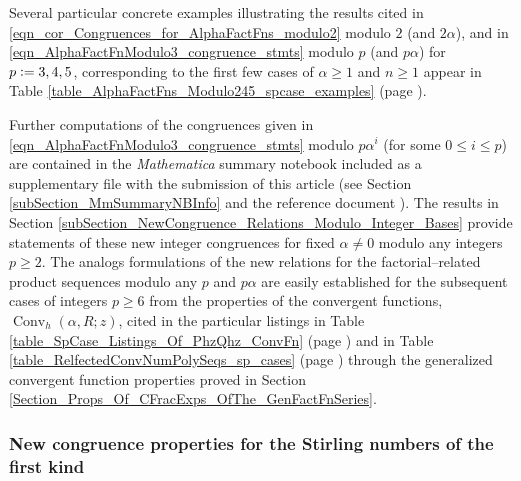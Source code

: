 \documentclass[12pt,reqno]{article}
\numberwithin{sfootnote}{section}
\newcommand{\tableref}[1]{Table \ref{#1} (page \pageref{#1})}
\numberwithin{equation}{section}
\theoremstyle{plain}
\theoremstyle{definition}
\theoremstyle{remark}
\newcommand{\defequals}{\ensuremath{\vcentcolon=}}
\newcommand{\Mm}[0]{\emph{Mathematica}}
\newcommand{\ConvGF}[4]{\ensuremath{\Conv_{#1}\left(#2, #3; #4\right)}}
\DeclareMathOperator{\Conv}{Conv}
\begin{document}
Several particular concrete examples illustrating the 
results cited in 
\eqref{eqn_cor_Congruences_for_AlphaFactFns_modulo2} 
modulo $2$ (and $2\alpha$), and in 
\eqref{eqn_AlphaFactFnModulo3_congruence_stmts} 
modulo $p$ (and $p\alpha$) for $p \defequals 3, 4, 5$, 
corresponding to the first few cases of 
$\alpha \geq 1$ and $n \geq 1$ appear in 
\tableref{table_AlphaFactFns_Modulo245_spcase_examples}. 

Further computations of the congruences given in 
\eqref{eqn_AlphaFactFnModulo3_congruence_stmts} 
modulo $p\alpha^{i}$ (for some $0 \leq i \leq p$) are contained in the 
\Mm{} summary notebook 
included as a supplementary file with the 
submission of this article 
(see Section \ref{subSection_MmSummaryNBInfo} and the 
reference document \citep{SUMMARYNBREF-STUB}). 
The results in 
Section \ref{subSection_NewCongruence_Relations_Modulo_Integer_Bases} 
provide statements of these new integer congruences 
for fixed $\alpha \neq 0$ modulo any integers $p \geq 2$. 
The analogs formulations of 
the new relations for the factorial--related product sequences 
modulo any $p$ and $p\alpha$ 
are easily established for the subsequent cases of integers $p \geq 6$ 
from the properties of the 
convergent functions, $\ConvGF{h}{\alpha}{R}{z}$, 
cited in the particular listings in 
\tableref{table_SpCase_Listings_Of_PhzQhz_ConvFn} and in 
\tableref{table_RelfectedConvNumPolySeqs_sp_cases} 
through the generalized convergent function properties proved in 
Section \ref{Section_Props_Of_CFracExps_OfThe_GenFactFnSeries}. 

\subsubsection{New congruence properties for the 
               Stirling numbers of the first kind} 
\end{document}
